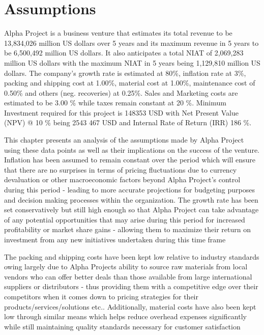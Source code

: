 

\section{Assumptions}\label{sec:assumptions}
Alpha Project is a business venture that estimates its total revenue to be 13,834,026 million US dollars over 5 years and its maximum revenue in 5 years to be 6,500,492 million US dollars. It also anticipates a total NIAT of 2,069,283 million US dollars with the maximum NIAT in 5 years being 1,129,810 million US dollars. The company's growth rate is estimated at 80\%, inflation rate at 3\%, packing and shipping cost at 1.00\%, material cost at 1.00\%, maintenance cost of 0.50\% and others (neg. recoveries) at 0.25\%. Sales and Marketing costs are estimated to be 3.00 \% while taxes remain constant at 20 \%. Minimum Investment required for this project is 148353 USD with Net Present Value (NPV) @ 10 \% being 2543 467 USD and Internal Rate of Return (IRR) 186 \%. 

This chapter presents an analysis of the assumptions made by Alpha Project using these data points as well as their implications on the success of the venture. Inflation has been assumed to remain constant over the period which will ensure that there are no surprises in terms of pricing fluctuations due to currency devaluation or other macroeconomic factors beyond Alpha Project's control during this period - leading to more accurate projections for budgeting purposes and decision making processes within the organization. The growth rate has been set conservatively but still high enough so that Alpha Project can take advantage of any potential opportunities that may arise during this period for increased profitability or market share gains - allowing them to maximize their return on investment from any new initiatives undertaken during this time frame 

The packing and shipping costs have been kept low relative to industry standards owing largely due to Alpha Projects ability to source raw materials from local vendors who can offer better deals than those available from large international suppliers or distributors - thus providing them with a competitive edge over their competitors when it comes down to pricing strategies for their products/services/solutions etc.. Additionally, material costs have also been kept low through similar means which helps reduce overhead expenses significantly while still maintaining quality standards necessary for customer satisfaction 

